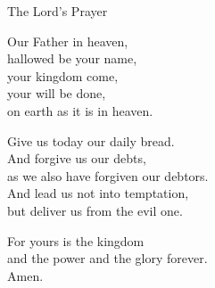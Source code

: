 \begin{bibletext}{The Lord's Prayer}
    \songtextsize
    \begin{verseframe}
        Our Father in heaven, \\
        hallowed be your name, \\
        your kingdom come, \\
        your will be done, \\
        on earth as it is in heaven.
    \end{verseframe}

    \begin{verseframe}
        Give us today our daily bread. \\
        And forgive us our debts, \\
        as we also have forgiven our debtors. \\
        And lead us not into temptation, \\
        but deliver us from the evil one.
    \end{verseframe}

    \begin{verseframe}
        For yours is the kingdom \\
        and the power and the glory forever. \\
        Amen.
    \end{verseframe}
\end{bibletext}
\endinput
